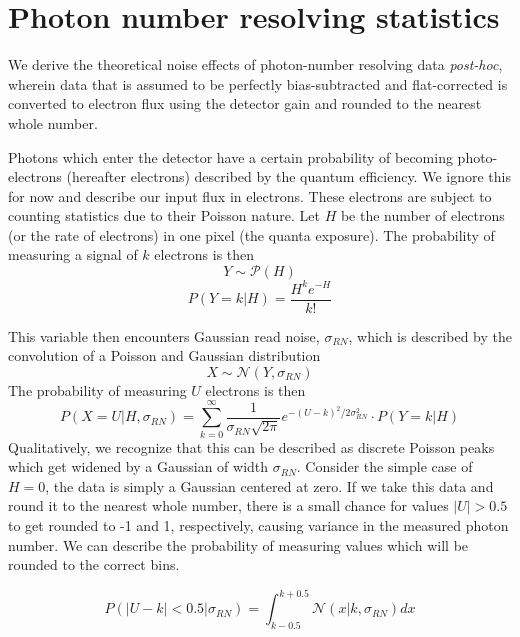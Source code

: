 \section{Photon number resolving statistics}\label{sec:pnr_derivation}

We derive the theoretical noise effects of photon-number resolving data \textit{post-hoc}, wherein data that is assumed to be perfectly bias-subtracted and flat-corrected is converted to electron flux using the detector gain and rounded to the nearest whole number.

Photons which enter the detector have a certain probability of becoming photo-electrons (hereafter electrons) described by the quantum efficiency. We ignore this for now and describe our input flux in electrons. These electrons are subject to counting statistics due to their Poisson nature. Let $H$ be the number of electrons (or the rate of electrons) in one pixel (the quanta exposure). The probability of measuring a signal of $k$ electrons is then
\begin{equation}
    Y \sim \mathcal{P}(H)
\end{equation}
\begin{equation}
    P(Y=k | H) = \frac{H^k e^{-H}}{k!}
\end{equation}

This variable then encounters Gaussian read noise, $\sigma_{RN}$, which is described by the convolution of a Poisson and Gaussian distribution
\begin{equation}
    X \sim \mathcal{N}(Y, \sigma_{RN})
\end{equation}
The probability of measuring $U$ electrons is then
\begin{equation}
    P(X = U | H, \sigma_{RN}) = \sum_{k=0}^\infty{\frac{1}{\sigma_{RN}\sqrt{2\pi}}e^{-(U - k)^2 / 2\sigma_{RN}^2}\cdot P(Y=k|H)}
\end{equation}
Qualitatively, we recognize that this can be described as discrete Poisson peaks which get widened by a Gaussian of width $\sigma_{RN}$. Consider the simple case of $H=0$, the data is simply a Gaussian centered at zero. If we take this data and round it to the nearest whole number, there is a small chance for values $|U|>0.5$  to get rounded to -1 and 1, respectively, causing variance in the measured photon number. We can describe the probability of measuring values which will be rounded to the correct bins.

\begin{equation}
    P\left(|U - k| < 0.5 | \sigma_{RN}\right) = \int_{k - 0.5}^{k + 0.5}{\mathcal{N}(x | k, \sigma_{RN}) dx}
\end{equation}

